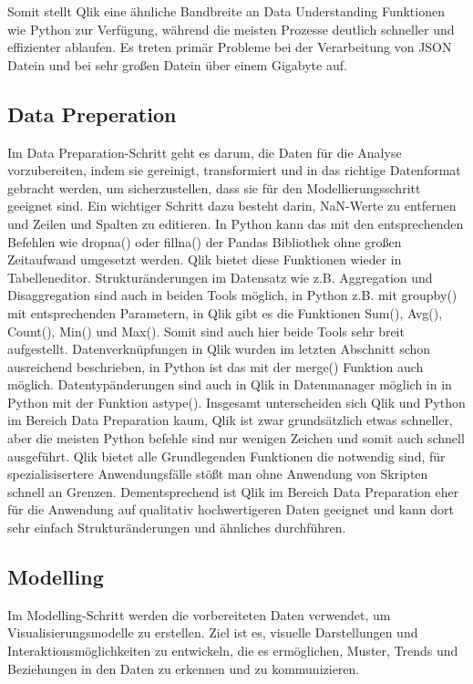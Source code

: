 \documentclass[12pt]{article}
\begin{document}
	Somit stellt Qlik eine ähnliche Bandbreite an Data Understanding Funktionen wie Python zur Verfügung, während die meisten Prozesse deutlich schneller und effizienter ablaufen. Es treten primär Probleme bei der Verarbeitung von JSON Datein und bei sehr großen Datein über einem Gigabyte auf.
	
	\subsection{Data Preperation}
	Im Data Preparation-Schritt geht es darum, die Daten für die Analyse vorzubereiten, indem sie gereinigt, transformiert und in das richtige Datenformat gebracht werden, um sicherzustellen, dass sie für den Modellierungsschritt geeignet sind.
	Ein wichtiger Schritt dazu besteht darin, NaN-Werte zu entfernen und Zeilen und Spalten zu editieren. In Python kann das mit den entsprechenden Befehlen wie dropna() oder fillna() der Pandas Bibliothek ohne großen Zeitaufwand umgesetzt werden.
	Qlik bietet diese Funktionen wieder in Tabelleneditor.
	Strukturänderungen im Datensatz wie z.B. Aggregation und Disaggregation sind auch in beiden Tools möglich, in Python z.B. mit groupby() mit entsprechenden Parametern, in Qlik gibt es die Funktionen Sum(), Avg(), Count(), Min() und Max().
	Somit sind auch hier beide Tools sehr breit aufgestellt.
	Datenverknüpfungen in Qlik wurden im letzten Abschnitt schon ausreichend beschrieben, in Python ist das mit der  merge() Funktion auch möglich.
	Datentypänderungen sind auch in Qlik in Datenmanager möglich in in Python mit der Funktion astype().
	Insgesamt unterscheiden sich Qlik und Python im Bereich Data Preparation kaum, Qlik ist zwar grundsätzlich etwas schneller, aber die meisten Python befehle sind nur wenigen Zeichen und somit auch schnell ausgeführt. Qlik bietet alle Grundlegenden Funktionen die notwendig sind, für spezialisisertere Anwendungsfälle stößt man ohne Anwendung von Skripten schnell an Grenzen. Dementsprechend ist Qlik im Bereich Data Preparation eher für die Anwendung auf qualitativ hochwertigeren Daten geeignet und kann dort sehr einfach Strukturänderungen und ähnliches durchführen.
	
	
	\subsection{Modelling}
	Im Modelling-Schritt werden die vorbereiteten Daten verwendet, um Visualisierungsmodelle zu erstellen. Ziel ist es, visuelle Darstellungen und Interaktionsmöglichkeiten zu entwickeln, die es ermöglichen, Muster, Trends und Beziehungen in den Daten zu erkennen und zu kommunizieren.
	
\end{document}

